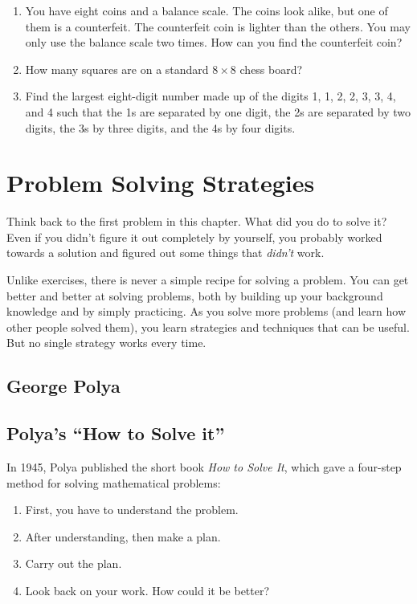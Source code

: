 \begin{enumerate}
\item
You have eight coins and a balance scale.  The coins look alike, but one of them is a counterfeit.  The counterfeit coin is lighter than the others.  You may only use the balance scale two times.  How can you find the counterfeit coin?


\item
How many squares are on a standard $8 \times 8$ chess board?


\item
Find the largest eight-digit number made up of the digits 1, 1, 2, 2, 3, 3, 4, and 4 such that the 1s are separated by one digit, the 2s are separated by two digits, the 3s by three digits, and the 4s by four digits.

\end{enumerate}


\section{Problem Solving Strategies}
Think back to the first problem in this chapter.  What did you do to solve it?  Even if you didn't figure it out completely by yourself, you probably worked towards a solution and figured out some things that \emph{didn't} work.   

Unlike exercises, there is never a simple recipe for solving a problem.  You can get better and better at solving problems, both by building up your background knowledge and by simply practicing.  As you solve more problems (and learn how other people solved them), you learn strategies and techniques that can be useful.  But no single strategy works every time. 

\subsection{George Polya}

\subsection{Polya's ``How to Solve it''}
In 1945, Polya published the short book \emph{How to Solve It}, which gave a four-step method for solving mathematical problems:
\begin{enumerate}
\item
First, you have to understand the problem.
\item
After understanding, then make a plan.
\item
Carry out the plan.
\item
Look back on your work. How could it be better?
\end{enumerate}

